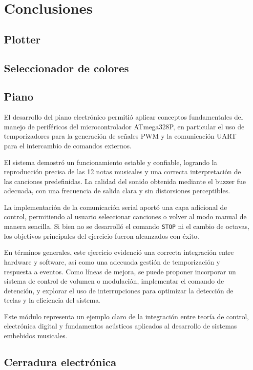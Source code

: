 
\section{Conclusiones}

\subsection{Plotter}

\subsection{Seleccionador de colores}

\subsection{Piano}
El desarrollo del piano electrónico permitió aplicar conceptos fundamentales del manejo de periféricos del microcontrolador ATmega328P, en particular el uso de temporizadores para la generación de señales PWM y la comunicación UART para el intercambio de comandos externos.  

El sistema demostró un funcionamiento estable y confiable, logrando la reproducción precisa de las 12 notas musicales y una correcta interpretación de las canciones predefinidas. La calidad del sonido obtenida mediante el buzzer fue adecuada, con una frecuencia de salida clara y sin distorsiones perceptibles.  

La implementación de la comunicación serial aportó una capa adicional de control, permitiendo al usuario seleccionar canciones o volver al modo manual de manera sencilla. Si bien no se desarrolló el comando \texttt{STOP} ni el cambio de octavas, los objetivos principales del ejercicio fueron alcanzados con éxito.  

En términos generales, este ejercicio evidenció una correcta integración entre hardware y software, así como una adecuada gestión de temporización y respuesta a eventos. Como líneas de mejora, se puede proponer incorporar un sistema de control de volumen o modulación, implementar el comando de detención, y explorar el uso de interrupciones para optimizar la detección de teclas y la eficiencia del sistema.

Este módulo representa un ejemplo claro de la integración entre teoría de control, electrónica digital y fundamentos acústicos aplicados al desarrollo de sistemas embebidos musicales.

\subsection{Cerradura electrónica}
